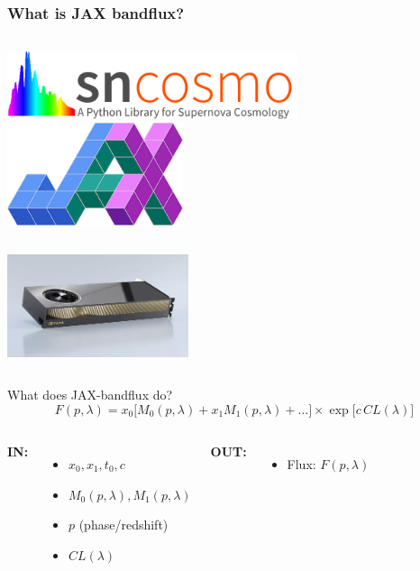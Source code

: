 \documentclass[aspectratio=169]{beamer}
\begin{document}
\begin{frame}
\frametitle{What is JAX bandflux?}
\begin{columns}[c]
  \centering
  \includegraphics[height=2cm]{images/sncosmobanner.png}
  \centering
  \includegraphics[height=3cm]{images/jax_logo_250px.png}
\end{columns}
\vspace{1cm}
\begin{columns}
  \centering
  \includegraphics[height=3cm]{images/gpu.jpg}
\end{columns}
\end{frame}

\begin{frame}{What does JAX-bandflux do?}
  \begin{equation}
    F(p, \lambda) = x_0 \bigl[ M_0(p,\lambda) + x_1 M_1(p,\lambda) + \ldots \bigr] \times \exp\bigl[c \, CL(\lambda)\bigr]
  \end{equation}
  \begin{columns}
      \textbf{IN:}
      \begin{itemize}
        \item $x_0, x_1, t_0, c$
        \item $M_0(p,\lambda), M_1(p,\lambda)$
        \item $p$ (phase/redshift)
        \item $CL(\lambda)$
      \end{itemize}
      \textbf{OUT:}
      \begin{itemize}
        \item Flux: $F(p,\lambda)$
      \end{itemize}
  \end{columns}
\end{frame}
\end{document}
